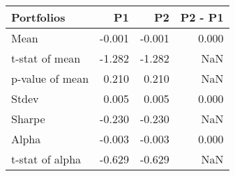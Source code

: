 \begin{tabular}{lrrr}
\toprule
Portfolios & P1 & P2 & P2 - P1 \\
\midrule
Mean & -0.001 & -0.001 & 0.000 \\
t-stat of mean & -1.282 & -1.282 & NaN \\
p-value of mean & 0.210 & 0.210 & NaN \\
Stdev & 0.005 & 0.005 & 0.000 \\
Sharpe & -0.230 & -0.230 & NaN \\
Alpha & -0.003 & -0.003 & 0.000 \\
t-stat of alpha & -0.629 & -0.629 & NaN \\
\bottomrule
\end{tabular}
